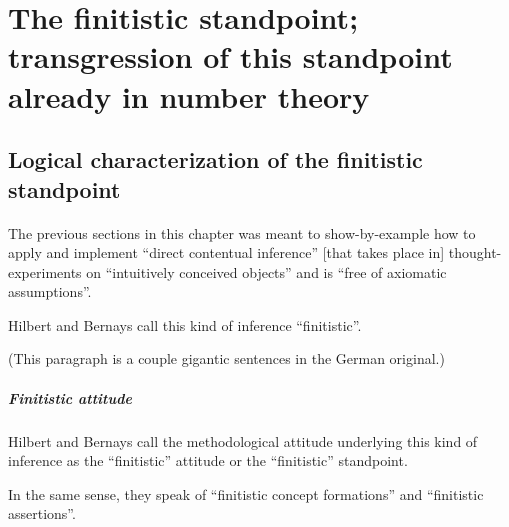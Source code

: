 \section[The finitistic standpoint]{The finitistic standpoint; transgression of this standpoint already in number theory}

\subsection{Logical characterization of the finitistic standpoint}
\paragraph{} %

The previous sections in this chapter was meant to show-by-example how
to apply and implement ``direct contentual inference'' [that takes
  place in] thought-experiments on ``intuitively conceived objects''
and is ``free of axiomatic assumptions''.

Hilbert and Bernays call this kind of inference ``finitistic''.

(This paragraph is a couple gigantic sentences in the German original.)

\subparagraph{Finitistic attitude}
Hilbert and Bernays call the methodological attitude underlying this
kind of inference as the ``finitistic'' attitude or the ``finitistic''
standpoint.

In the same sense, they speak of ``finitistic concept formations'' and
``finitistic assertions''.

